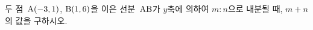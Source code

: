 두 점~$\mathrm{A}(-3{,}\mkern3mu\mathopen{}1)$, $\mathrm{B}(1{,}\mkern3mu\mathopen{}6)$을 이은 선분~$\mathrm{AB}$가 $y$축에 의하여 $m:n$으로 내분될 때, $m+n$의 값을 구하시오. 
